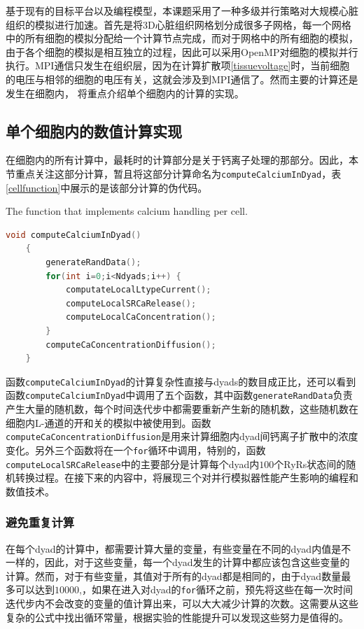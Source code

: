 基于现有的目标平台以及编程模型，本课题采用了一种多级并行策略对大规模心脏组织的模拟进行加速。首先是将3D心脏组织网格划分成很多子网格，每一个网格中的所有细胞的模拟分配给一个计算节点完成，而对于网格中的所有细胞的模拟，由于各个细胞的模拟是相互独立的过程，因此可以采用OpenMP对细胞的模拟并行执行。MPI通信只发生在组织层，因为在计算扩散项\ref{tissuevoltage}时，当前细胞的电压与相邻的细胞的电压有关，这就会涉及到MPI通信了。然而主要的计算还是发生在细胞内， \label{cellImp}将重点介绍单个细胞内的计算的实现。
 
 \subsection{单个细胞内的数值计算实现}
 \label{cellImp}
 在细胞内的所有计算中，最耗时的计算部分是关于钙离子处理的那部分。因此，本节重点关注这部分计算，暂且将这部分计算命名为{\tt computeCalciumInDyad}，表\ref{cellfunction}中展示的是该部分计算的伪代码。
 
 \begin{table}
\caption{The function that implements calcium handling per cell.}
\label{cellfunction}
\begin{lstlisting}[language=C++, basicstyle=\ttfamily\footnotesize]
void computeCalciumInDyad()
    {
        generateRandData();
        for(int i=0;i<Ndyads;i++) {
            computateLocalLtypeCurrent();
            computeLocalSRCaRelease();
            computeLocalCaConcentration();
        }
        computeCaConcentrationDiffusion();
    }
\end{lstlisting}
\end{table}

 函数{\tt  computeCalciumInDyad}的计算复杂性直接与dyads的数目成正比，还可以看到函数{\tt  computeCalciumInDyad}中调用了五个函数，其中函数{\tt generateRandData}负责产生大量的随机数，每个时间迭代步中都需要重新产生新的随机数，这些随机数在细胞内L-通道的开和关的模拟中被使用到。函数{\tt  computeCaConcentrationDiffusion}是用来计算细胞内dyad间钙离子扩散中的浓度变化。另外三个函数将在一个{\tt for}循环中调用，特别的，函数{\tt computeLocalSRCaRelease}中的主要部分是计算每个dyad内$100$个RyRs状态间的随机转换过程。在接下来的内容中，将展现三个对并行模拟器性能产生影响的编程和数值技术。
 
 \subsubsection{避免重复计算}
在每个dyad的计算中，都需要计算大量的变量，有些变量在不同的dyad内值是不一样的，因此，对于这些变量，每一个dyad发生的计算中都应该包含这些变量的计算。然而，对于有些变量，其值对于所有的dyad都是相同的，由于dyad数量最多可以达到$10000$,，如果在进入对dyad的{\tt for}循环之前，预先将这些在每一次时间迭代步内不会改变的变量的值计算出来，可以大大减少计算的次数。这需要从这些复杂的公式中找出循环常量，根据实验的性能提升可以发现这些努力是值得的。

